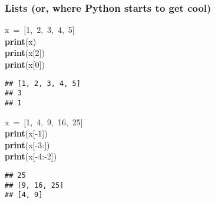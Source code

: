 \documentclass{beamer}\usepackage[]{graphicx}\usepackage[]{color}
\makeatletter
\newcommand{\hlnum}[1]{\textcolor[rgb]{0.686,0.059,0.569}{#1}}%
\newcommand{\hlopt}[1]{\textcolor[rgb]{0,0,0}{#1}}%
\newcommand{\hlstd}[1]{\textcolor[rgb]{0.345,0.345,0.345}{#1}}%
\newcommand{\hlkwa}[1]{\textcolor[rgb]{0.161,0.373,0.58}{\textbf{#1}}}%
\newenvironment{kframe}{%
 \def\at@end@of@kframe{}%
 \ifinner\ifhmode%
  \def\at@end@of@kframe{\end{minipage}}%
  \begin{minipage}{\columnwidth}%
 \fi\fi%
 \def\FrameCommand##1{\hskip\@totalleftmargin \hskip-\fboxsep
 \colorbox{shadecolor}{##1}\hskip-\fboxsep
     \hskip-\linewidth \hskip-\@totalleftmargin \hskip\columnwidth}%
 \MakeFramed {\advance\hsize-\width
   \@totalleftmargin\z@ \linewidth\hsize
   \@setminipage}}%
 {\par\unskip\endMakeFramed%
 \at@end@of@kframe}
\newenvironment{knitrout}{}{} %
\makeatother
\begin{document}
\begin{frame}[fragile]
\frametitle{Lists (or, where Python starts to get cool)}
\begin{knitrout}
\color{fgcolor}\begin{kframe}
\noindent
\ttfamily
\hlstd{x\ }\hlopt{=\ {[}}\hlstd{}\hlnum{1}\hlstd{}\hlopt{,\ }\hlstd{}\hlnum{2}\hlstd{}\hlopt{,\ }\hlstd{}\hlnum{3}\hlstd{}\hlopt{,\ }\hlstd{}\hlnum{4}\hlstd{}\hlopt{,\ }\hlstd{}\hlnum{5}\hlstd{}\hlopt{{]}\ }\hlstd{}\hspace*{\fill}\\
\hlstd{}\hlkwa{print}\hlstd{}\hlopt{(}\hlstd{x}\hlopt{)}\hspace*{\fill}\\
\hlstd{}\hlkwa{print}\hlstd{}\hlopt{(}\hlstd{x}\hlopt{{[}}\hlstd{}\hlnum{2}\hlstd{}\hlopt{{]})}\hspace*{\fill}\\
\hlstd{}\hlkwa{print}\hlstd{}\hlopt{(}\hlstd{x}\hlopt{{[}}\hlstd{}\hlnum{0}\hlstd{}\hlopt{{]})}\hlstd{}\hspace*{\fill}
\mbox{}
\normalfont

\begin{verbatim}
## [1, 2, 3, 4, 5]
## 3
## 1
\end{verbatim}
\end{kframe}
\end{knitrout}

\begin{knitrout}
\color{fgcolor}\begin{kframe}
\noindent
\ttfamily
\hlstd{x\ }\hlopt{=\ {[}}\hlstd{}\hlnum{1}\hlstd{}\hlopt{,\ }\hlstd{}\hlnum{4}\hlstd{}\hlopt{,\ }\hlstd{}\hlnum{9}\hlstd{}\hlopt{,\ }\hlstd{}\hlnum{16}\hlstd{}\hlopt{,\ }\hlstd{}\hlnum{25}\hlstd{}\hlopt{{]}}\hspace*{\fill}\\
\hlstd{}\hlkwa{print}\hlstd{}\hlopt{(}\hlstd{x}\hlopt{{[}{-}}\hlstd{}\hlnum{1}\hlstd{}\hlopt{{]})}\hspace*{\fill}\\
\hlstd{}\hlkwa{print}\hlstd{}\hlopt{(}\hlstd{x}\hlopt{{[}{-}}\hlstd{}\hlnum{3}\hlstd{}\hlopt{:{]})}\hspace*{\fill}\\
\hlstd{}\hlkwa{print}\hlstd{}\hlopt{(}\hlstd{x}\hlopt{{[}{-}}\hlstd{}\hlnum{4}\hlstd{}\hlopt{:{-}}\hlstd{}\hlnum{2}\hlstd{}\hlopt{{]})}\hlstd{}\hspace*{\fill}
\mbox{}
\normalfont

\begin{verbatim}
## 25
## [9, 16, 25]
## [4, 9]
\end{verbatim}
\end{kframe}
\end{knitrout}
\end{frame}
\end{document}
